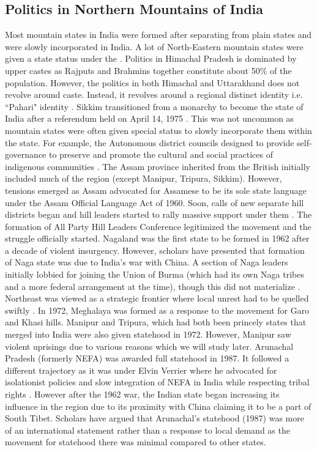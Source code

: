 \begin{sloppypar}
\subsection{Politics in Northern Mountains of India}

Most mountain states in India were formed after separating from plain states and were slowly incorporated in India. A lot of North-Eastern mountain states were given a state status under the \cite{North_eastern_reorg_1971}.  Politics in Himachal Pradesh is dominated by upper castes as  Rajputs and Brahmins together constitute about 50\% of the population. However, the politics in both Himachal and Uttarakhand does not revolve around caste. Instead, it revolves around a regional distinct identity i.e. ``Pahari" identity \citep{mishra2000politics}. Sikkim transitioned from a monarchy to become the  state of India after a referendum held on April 14, 1975 \citep{code1979volume}. This was not uncommon as mountain states were often given special status to slowly incorporate them within the state. For example, the Autonomous district councils  designed to provide self-governance to preserve and promote the cultural and social practices of indigenous communities \citep{pautunthang2024india}. The Assam province inherited from the British initially included much of the region (except Manipur, Tripura, Sikkim). However, tensions emerged as Assam advocated for Assamese to be its sole state language under the Assam Official Language Act of 1960. Soon, calls of new separate hill districts began and hill leaders started to rally massive support under them \citep{inoue2005integration}. The formation of All Party Hill Leaders Conference legitimized the movement and the struggle officially started. Nagaland was the first state to be formed in 1962 after a decade of violent insurgency. However, scholars have presented that formation of Naga state was due to India's war with China.  A section of Naga leaders initially lobbied for joining the Union of Burma (which had its own Naga tribes and a more federal arrangement at the time), though this did not materialize \citep{Wouters_2023}. Northeast was viewed as a strategic frontier where local unrest had to be quelled swiftly \citep{johari1975creation}. In 1972, Meghalaya was formed as a response to the movement for Garo and Khasi hills. Manipur and Tripura, which had both been princely states that merged into India were also given statehood in 1972. However, Manipur saw violent uprisings due to various reasons which we will study later. Arunachal Pradesh (formerly NEFA) was awarded full statehood in 1987. It followed a different trajectory as it was under Elvin Verrier where he advocated for isolationist policies and slow integration of NEFA in India while respecting tribal rights \citep{verrier_elvin_2008}. However after the 1962 war, the Indian state began increasing its influence in the region due to its proximity with China claiming it to be a part of South Tibet. Scholars have argued that Arunachal’s statehood (1987) was  more of an international statement rather than a response to local demand as the movement for statehood there was minimal compared to other states.


\end{sloppypar}
